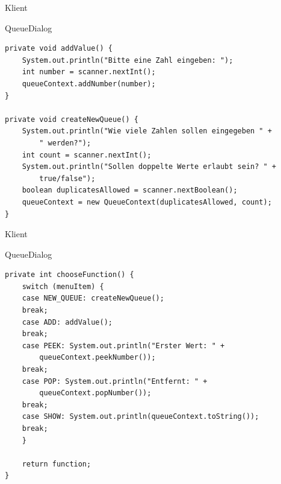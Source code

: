 \begin{frame}[fragile]{Klient}
	\begin{exampleblock}{QueueDialog}
        \begin{lstlisting}
private void addValue() {
    System.out.println("Bitte eine Zahl eingeben: ");
    int number = scanner.nextInt();
    queueContext.addNumber(number);
}

private void createNewQueue() {
    System.out.println("Wie viele Zahlen sollen eingegeben " +
        " werden?");
    int count = scanner.nextInt();
    System.out.println("Sollen doppelte Werte erlaubt sein? " + 
        true/false");
    boolean duplicatesAllowed = scanner.nextBoolean();
    queueContext = new QueueContext(duplicatesAllowed, count);
}
        \end{lstlisting}
 	\end{exampleblock}
\end{frame}

\begin{frame}[fragile]{Klient}
	\begin{exampleblock}{QueueDialog}
        \begin{lstlisting}
private int chooseFunction() {
    switch (menuItem) {
    case NEW_QUEUE: createNewQueue();
    break;
    case ADD: addValue();
    break;
    case PEEK: System.out.println("Erster Wert: " + 
        queueContext.peekNumber());
    break;
    case POP: System.out.println("Entfernt: " +     
        queueContext.popNumber());
    break;
    case SHOW: System.out.println(queueContext.toString());
    break;
    }
    
    return function;
}
        \end{lstlisting}
 	\end{exampleblock}
\end{frame}